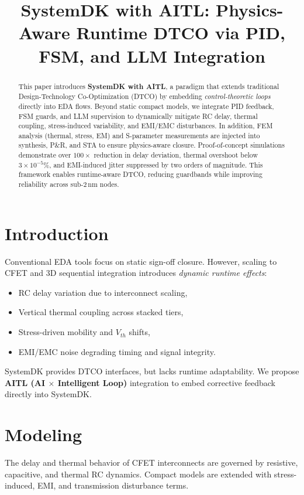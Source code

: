 \documentclass[conference]{IEEEtran}
\title{SystemDK with AITL: Physics-Aware Runtime DTCO via PID, FSM, and LLM Integration}
\author{
  \IEEEauthorblockN{Shinichi Samizo}
  \IEEEauthorblockA{Independent Semiconductor Researcher\\
  Email: \href{mailto:shin3t72@gmail.com}{shin3t72@gmail.com}}
}
\begin{document}
\maketitle

\begin{abstract}
This paper introduces \textbf{SystemDK with AITL}, a paradigm that extends
traditional Design-Technology Co-Optimization (DTCO) by embedding
\emph{control-theoretic loops} directly into EDA flows.
Beyond static compact models, we integrate PID feedback, FSM guards,
and LLM supervision to dynamically mitigate RC delay, thermal coupling,
stress-induced variability, and EMI/EMC disturbances.
In addition, FEM analysis (thermal, stress, EM) and S-parameter measurements
are injected into synthesis, P\&R, and STA to ensure physics-aware closure.
Proof-of-concept simulations demonstrate over $100\times$ reduction in delay deviation,
thermal overshoot below $3\times 10^{-5}\%$, and EMI-induced jitter suppressed by two orders of magnitude.
This framework enables runtime-aware DTCO, reducing guardbands while improving reliability across sub-2\,nm nodes.
\end{abstract}

\section{Introduction}
Conventional EDA tools focus on static sign-off closure.
However, scaling to CFET and 3D sequential integration introduces \emph{dynamic runtime effects}:
\begin{itemize}
  \item RC delay variation due to interconnect scaling,
  \item Vertical thermal coupling across stacked tiers,
  \item Stress-driven mobility and $V_{th}$ shifts,
  \item EMI/EMC noise degrading timing and signal integrity.
\end{itemize}
SystemDK provides DTCO interfaces, but lacks runtime adaptability.
We propose \textbf{AITL (AI $\times$ Intelligent Loop)} integration to embed corrective feedback directly into SystemDK.

\section{Modeling}
The delay and thermal behavior of CFET interconnects are governed by resistive,
capacitive, and thermal RC dynamics. Compact models are extended with
stress-induced, EMI, and transmission disturbance terms.
\end{document}
